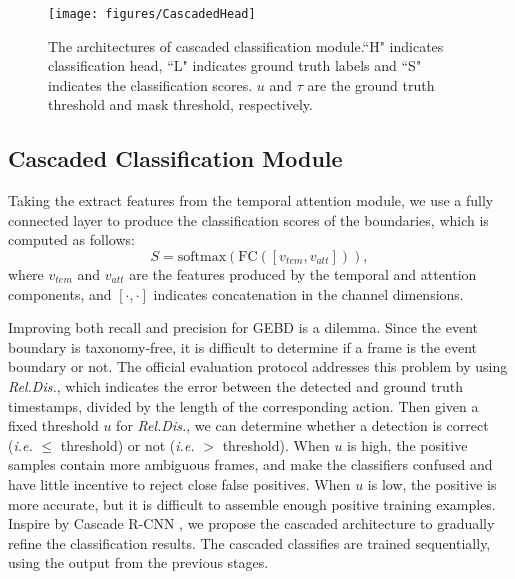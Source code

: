 \documentclass[final]{cvpr}
\begin{document}
\begin{figure}
\begin{center}
\texttt{[image: figures/CascadedHead]}
\end{center}
   \caption{The architectures of cascaded classification module.``H" indicates classification head, ``L" indicates ground truth labels and ``S" indicates the classification scores. $u$ and $\tau$ are the ground truth threshold and mask threshold, respectively.}
\label{fig:cascade_head}
\end{figure}


\subsection{Cascaded Classification Module}\label{sec:cascaded_classifier}
Taking the extract features from the temporal attention module, we use a fully connected layer to produce the classification scores of the boundaries, which is computed as follows:
\begin{equation}
    S = \text{softmax}(\text{FC}([v_{tem}, v_{att}])),
\end{equation}
where $v_{tem}$ and $v_{att}$ are the features produced by the temporal and attention components, and $[\cdot, \cdot]$ indicates concatenation in the channel dimensions.

Improving both recall and precision for GEBD is a dilemma. Since the event boundary is taxonomy-free, it is difficult to determine if a frame is the event boundary or not. The official evaluation protocol \cite{DBLP:journals/corr/GEBD_dataset} addresses this problem by using \textit{Rel.Dis.}, which indicates the error between the detected and ground truth timestamps, divided by the length of the corresponding action. Then given a fixed threshold $u$ for \textit{Rel.Dis.}, we can determine whether a detection is correct (\textit{i.e.} $\leq$ threshold) or not (\textit{i.e.} $>$ threshold). When $u$ is high, the positive samples contain more ambiguous frames, and make the classifiers confused and have little incentive to reject close false positives. When $u$ is low, the positive is more accurate, but it is difficult to assemble enough positive training examples. Inspire by Cascade R-CNN \cite{DBLP:conf/cvpr/cascade-rcnn}, we propose the cascaded architecture to gradually refine the classification results. The cascaded classifies are trained sequentially, using the output from the previous stages.
\end{document}
